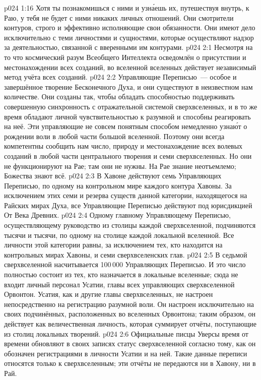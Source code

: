 \vs p024 1:16 Хотя ты познакомишься с ними и узн\'аешь их, путешествуя внутрь, к Раю, у тебя не будет с ними никаких личных отношений. Они смотрители контуров, строго и эффективно исполняющие свои обязанности. Они имеют дело исключительно с теми личностями и сущностями, которые осуществляют надзор за деятельностью, связанной с вверенными им контурами.
\vs p024 2:1 Несмотря на то что космический разум Всеобщего Интеллекта осведомлён о присутствии и местонахождении всех  созданий, во вселенной вселенных действует независимый метод учёта всех  созданий.
\vs p024 2:2 Управляющие Переписью~--- особое и завершённое творение Бесконечного Духа, и они существуют в неизвестном нам количестве. Они созданы так, чтобы обладать способностью поддерживать совершенную синхронность с отражательной системой сверхвселенных, и в то же время обладают личной чувствительностью к разумной  и способны реагировать на неё. Эти управляющие не совсем понятным способом немедленно узна\'ют о рождении воли в любой части большой вселенной. Поэтому они всегда компетентны сообщить нам число, природу и местонахождение всех волевых созданий в любой части центрального творения и семи сверхвселенных. Но они не функционируют на Рае; там они не нужны. На Рае знание неотъемлемо; Божества знают всё.
\vs p024 2:3 \pc В Хавоне действуют семь Управляющих Переписью, по одному на контрольном мире каждого контура Хавоны. За исключением этих семи и резерва существ данной категории, находящегося на Райских мирах Духа, все Управляющие Переписью действуют под юрисдикцией От Века Древних.
\vs p024 2:4 Одному главному Управляющему Переписью, осуществляющему руководство из столицы каждой сверхвселенной, подчиняются тысячи и тысячи, по одному на столице каждой локальной вселенной. Все личности этой категории равны, за исключением тех, кто находится на контрольных мирах Хавоны, и семи сверхвселенских глав.
\vs p024 2:5 В седьмой сверхвселенной насчитывается 100\,000 Управляющих Переписью. И это число полностью состоит из тех, кто назначается в локальные вселенные; сюда не входит личный персонал Усатии, главы всех управляющих сверхвселенной Орвонтон. Усатия, как и другие главы сверхвселенных, не настроен непосредственно на регистрацию разумной воли. Он настроен исключительно на своих подчинённых, расположенных во вселенных Орвонтона; таким образом, он действует как величественная личность, которая суммирует отчёты, поступающие из столиц локальных творений.
\vs p024 2:6 Официальные писцы Уверсы время от времени обновляют в своих записях статус сверхвселенной согласно тому, как он обозначен регистрациями в личности Усатии и на ней. Такие данные переписи относятся только к сверхвселенным; эти отчёты не передаются ни в Хавону, ни в Рай.
